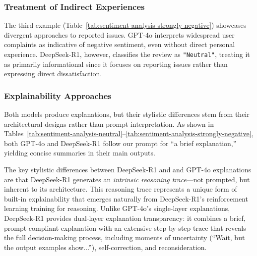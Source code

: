 \documentclass{IEEEcsmag}
\begin{document}
\subsubsection{\textbf{Treatment of Indirect Experiences}}
The third example (Table~\ref{tab:sentiment-analysis-strongly-negative}) showcases divergent approaches to reported issues. GPT-4o interprets widespread user complaints as indicative of negative sentiment, even without direct personal experience. DeepSeek-R1, however, classifies the review as \texttt{"Neutral"}, treating it as primarily informational since it focuses on reporting issues rather than expressing direct dissatisfaction.

\vspace{-10pt}
\subsubsection{\textbf{Explainability Approaches}}

Both models produce explanations, but their stylistic differences stem from their architectural designs rather than prompt interpretation. As shown in Tables~\ref{tab:sentiment-analysis-neutral}--\ref{tab:sentiment-analysis-strongly-negative}, both GPT-4o and DeepSeek-R1 follow our prompt for ``a brief explanation,'' yielding concise summaries in their main outputs.


The key stylistic differences between DeepSeek-R1 and and GPT-4o explanations are that DeepSeek-R1 generates an \emph{intrinsic reasoning trace}—not prompted, but inherent to its architecture. This reasoning trace represents a unique form of built-in explainability that emerges naturally from DeepSeek-R1’s reinforcement learning training for reasoning. Unlike GPT-4o’s single-layer explanations, DeepSeek-R1 provides dual-layer explanation transparency: it combines a brief, prompt-compliant explanation with an extensive step-by-step trace that reveals the full decision-making process, including moments of uncertainty (``Wait, but the output examples show...''), self-correction, and reconsideration.
\end{document}
